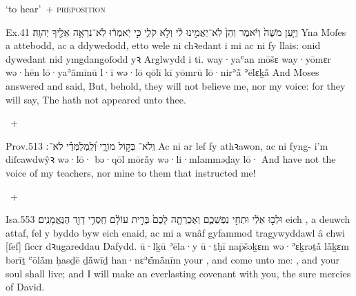 \begin{frame}{\ex {} ‘to hear’~+ \textsc{preposition}}
	\begin{example}{Ex.}{4}{1}{}{}
		\quoling
		{וַיַּ֤עַן מֹשֶׁה֙ וַיֹּ֔אמֶר וְהֵן֙ לֹֽא־יַאֲמִ֣ינוּ לִ֔י וְלֹ֥א  קֹלִ֑י כִּ֣י יֹֽאמְר֔וּ לֹֽא־נִרְאָ֥ה אֵלֶ֖יךָ יְהוָֽה׃}
		{Yna Moſes a attebodd, ac a ddywedodd, etto wele ni chꝛedant i mi ac ni   fy llais: onid dywedant nid ymgdangoſodd yꝛ Arglwydd i ti.}
		{way·yaʿan mōšɛ way·yōmɛr wə·hēn lō·yaʾămīnū l·ī wə·lō  qōlī kī yōmrū lō·nirʾå̄ ʾēlɛḵå̄ {\YHWH}}
		{And Moses answered and said, But, behold, they will not believe me, nor   my voice: for they will say, The {\LORD} hath not appeared unto thee.}
	\end{example}
\end{frame}


\begin{frame}{\ex {}~+ }
	\begin{example}{Prov.}{5}{13}{}{}
		\quoling
		{וְֽלֹא־ בְּק֣וֹל מוֹרָ֑י וְ֝לִֽמְלַמְּדַ֗י לֹא־ ׃}
		{Ac ni  ar lef fy athꝛawon, ac ni  fyng- i’m diſcawdwŷꝛ}
		{wə·lō· bə·qōl mōrå̄y wə·li·mlamməḏay lō· }
		{And have not  the voice of my teachers, nor  mine  to them that instructed me!}
	\end{example}
\end{frame}


\begin{frame}{\ex {}~+ }
	\begin{example}{Isa.}{55}{3}{}{}
		\quoling
		{  וּלְכ֣וּ אֵלַ֔י  וּתְחִ֣י נַפְשְׁכֶ֑ם וְאֶכְרְתָ֤ה לָכֶם֙ בְּרִ֣ית עוֹלָ֔ם חַֽסְדֵ֥י דָוִ֖ד הַנֶּאֱמָנִֽים׃}
		{ eich , a deuwch attaf,  fel y byddo byw eich enaid, ac mi a wnâf gyfammod tragywyddawl â chwi [ſef] ſiccr dꝛugareddau Dafydd.}
		{  ū·lḵū ʾēla·y  ū·ṯḥī nap̄šəḵɛm wə·ʾɛḵrəṯå̄ lå̄ḵɛm bərīṯ ʿōlå̄m ḥasḏē ḏå̄wīḏ han·nɛʾɛ̆må̄nīm}
		{ your , and come unto me: , and your soul shall live; and I will make an everlasting covenant with you,  the sure mercies of David.}
	\end{example}
\end{frame}


